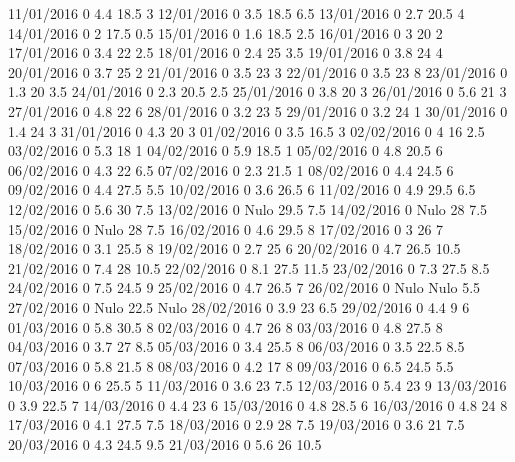 11/01/2016  0      4.4    18.5   3 
12/01/2016  0      3.5    18.5   6.5 
13/01/2016  0      2.7    20.5   4 
14/01/2016  0      2      17.5   0.5 
15/01/2016  0      1.6    18.5   2.5 
16/01/2016  0      3      20     2 
17/01/2016  0      3.4    22     2.5 
18/01/2016  0      2.4    25     3.5 
19/01/2016  0      3.8    24     4 
20/01/2016  0      3.7    25     2 
21/01/2016  0      3.5    23     3 
22/01/2016  0      3.5    23     8 
23/01/2016  0      1.3    20     3.5 
24/01/2016  0      2.3    20.5   2.5 
25/01/2016  0      3.8    20     3 
26/01/2016  0      5.6    21     3 
27/01/2016  0      4.8    22     6 
28/01/2016  0      3.2    23     5 
29/01/2016  0      3.2    24     1 
30/01/2016  0      1.4    24     3 
31/01/2016  0      4.3    20     3 
01/02/2016  0      3.5    16.5   3 
02/02/2016  0      4      16     2.5 
03/02/2016  0      5.3    18     1 
04/02/2016  0      5.9    18.5   1 
05/02/2016  0      4.8    20.5   6 
06/02/2016  0      4.3    22     6.5 
07/02/2016  0      2.3    21.5   1 
08/02/2016  0      4.4    24.5   6 
09/02/2016  0      4.4    27.5   5.5 
10/02/2016  0      3.6    26.5   6 
11/02/2016  0      4.9    29.5   6.5 
12/02/2016  0      5.6    30     7.5 
13/02/2016  0     Nulo    29.5   7.5 
14/02/2016  0     Nulo    28     7.5 
15/02/2016  0     Nulo    28     7.5 
16/02/2016  0      4.6    29.5   8 
17/02/2016  0      3      26     7 
18/02/2016  0      3.1    25.5   8 
19/02/2016  0      2.7    25     6 
20/02/2016  0      4.7    26.5   10.5 
21/02/2016  0      7.4    28     10.5 
22/02/2016  0      8.1    27.5   11.5 
23/02/2016  0      7.3    27.5   8.5 
24/02/2016  0      7.5    24.5   9 
25/02/2016  0      4.7    26.5   7 
26/02/2016  0     Nulo   Nulo    5.5 
27/02/2016  0     Nulo    22.5  Nulo
28/02/2016  0      3.9    23     6.5 
29/02/2016  0      4.4    9      6 
01/03/2016  0      5.8    30.5   8 
02/03/2016  0      4.7    26     8 
03/03/2016  0      4.8    27.5   8 
04/03/2016  0      3.7    27     8.5 
05/03/2016  0      3.4    25.5   8 
06/03/2016  0      3.5    22.5   8.5 
07/03/2016  0      5.8    21.5   8 
08/03/2016  0      4.2    17     8 
09/03/2016  0      6.5    24.5   5.5 
10/03/2016  0      6      25.5   5 
11/03/2016  0      3.6    23     7.5 
12/03/2016  0      5.4    23     9 
13/03/2016  0      3.9    22.5   7 
14/03/2016  0      4.4    23     6 
15/03/2016  0      4.8    28.5   6 
16/03/2016  0      4.8    24     8 
17/03/2016  0      4.1    27.5   7.5 
18/03/2016  0      2.9    28     7.5 
19/03/2016  0      3.6    21     7.5 
20/03/2016  0      4.3    24.5   9.5 
21/03/2016  0      5.6    26     10.5 
